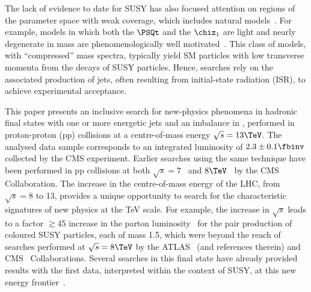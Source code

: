 The lack of evidence to date for SUSY has also focused attention on
regions of the parameter space with weak coverage, which includes
natural models~\cite{Delgado:2012eu, Boehm:1999tr, Carena:2008mj,
  Grober:2014aha, Grober:2015fia}. For example, models in which both
the $\PSQt$ and the $\chiz_1$ are light and nearly degenerate in mass
are phenomenologically well motivated~\cite{Boehm:1999bj,
  Balazs:2004bu, Martin:2007gf, Martin:2007hn}. This class of models,
with ``compressed'' mass spectra, typically yield SM particles with
low transverse momenta from the decays of SUSY particles. Hence,
searches rely on the associated production of jets, often resulting
from initial-state radiation (ISR), to achieve experimental
acceptance.

This paper presents an inclusive search for new-physics phenomena in
hadronic final states with one or more energetic jets and an imbalance
in \ptvecmiss, performed in proton-proton (pp) collisions at a
centre-of-mass energy $\sqrt{s} = 13\TeV$. The analysed data sample
corresponds to an integrated luminosity of $2.3 \pm 0.1
\fbinv$ %
collected by the CMS experiment. Earlier searches using the same
technique have been performed in pp collisions at both $\sqrt{s} =
7$~\cite{RA1Paper, RA1Paper2011, RA1Paper2011FULL} and
$8\TeV$~\cite{RA1Paper2012, RA1Parked} by the CMS Collaboration.
The increase in the centre-of-mass energy of the LHC, from $\sqrt{s} =
8$ to 13\TeV, provides a unique opportunity to search for the
characteristic signatures of new physics at the TeV scale. For
example, the increase in $\sqrt{s}$ leads to a factor $\gtrsim$45
increase in the parton luminosity~\cite{Martin:2009iq} for the pair
production of coloured SUSY particles, each of mass 1.5\TeV,
which were beyond the reach of searches performed at $\sqrt{s} =
8\TeV$ by the ATLAS~\cite{Aad:2015iea, Aad:2015pfx} (and references
therein) and CMS~\cite{CMS:2014dpa, Khachatryan:2015vra,
  Khachatryan:2016oia, Chatrchyan:2013wxa, Chatrchyan:2014lfa,
  Khachatryan:2015pwa, Khachatryan:2015wza, Khachatryan:2016zcu}
Collaborations. Several searches in this final state have already
provided results with the first data, interpreted within the context
of SUSY, at this new energy frontier~\cite{Aad:2016jxj,
  Aaboud:2016tnv, Aaboud:2016zdn, Aad:2016eki, Aaboud:2016nwl,
  Khachatryan:2016kdk, cms-13}.

